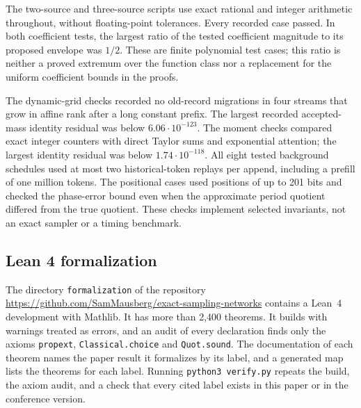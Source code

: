 The two-source and three-source scripts use exact rational and
integer arithmetic throughout, without floating-point tolerances.
Every recorded case passed. In both coefficient tests, the largest
ratio of the tested coefficient magnitude to its proposed envelope
was $1/2$. These are finite polynomial test cases; this ratio is
neither a proved extremum over the function class nor a replacement
for the uniform coefficient bounds in the proofs.

The dynamic-grid checks recorded no old-record migrations in
four streams that grow in affine rank after a long constant
prefix.  The largest recorded accepted-mass identity residual
was below $6.06\cdot10^{-123}$.  The moment checks compared
exact integer counters with direct Taylor sums and exponential
attention; the largest identity residual was below
$1.74\cdot10^{-118}$.  All eight tested background schedules
used at most two historical-token replays per append, including
a prefill of one million tokens.  The positional cases used
positions of up to 201 bits and checked the phase-error bound
even when the approximate period quotient differed from the
true quotient.  These checks implement selected invariants,
not an exact sampler or a timing benchmark.

\subsection{Lean 4 formalization}
\label{app:lean}

The directory \texttt{formalization} of the repository
\url{https://github.com/SamMausberg/exact-sampling-networks} contains a
Lean~4 development with Mathlib. It has more than 2{,}400 theorems. It
builds with warnings treated as errors, and an audit of every declaration
finds only the axioms \texttt{propext}, \texttt{Classical.choice} and
\texttt{Quot.sound}. The documentation of each theorem names the paper
result it formalizes by its label, and a generated map lists the theorems
for each label. Running \texttt{python3 verify.py} repeats the build, the
axiom audit, and a check that every cited label exists in this paper or in
the conference version.

